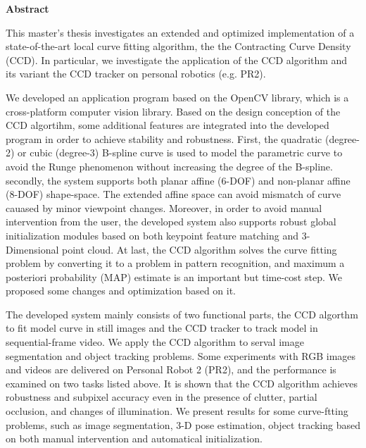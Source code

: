 

\clearemptydoublepage
{}
{}        





\vspace*{2cm}
\begin{center}
{\Large \bf Abstract}
\end{center}
\vspace{1cm}

This master's thesis investigates an extended and optimized
implementation of a state-of-the-art local curve fitting algorithm,
the the Contracting Curve Density (CCD).
In particular, we investigate
the application of the CCD algorithm and its variant the CCD tracker
on personal robotics (e.g. PR2).

We developed an application program based on the OpenCV library, which
is a cross-platform computer vision library. Based on the
design conception of the CCD algortihm, some
additional features are integrated into the developed program in order to
achieve stability and robustness. First, the quadratic (degree-2) or
cubic (degree-3) B-spline curve is used to model the parametric curve
to avoid the Runge phenomenon without increasing the degree of the
B-spline. secondly, the system supports both planar affine (6-DOF) and
non-planar affine (8-DOF) shape-space. The extended affine space can avoid
mismatch of curve cauased by minor viewpoint changes. Moreover, in
order to avoid manual intervention from the user, the developed system
also supports robust global initialization modules based on both keypoint
feature matching and 3-Dimensional point cloud. At last, the CCD
algorithm solves the curve fitting problem by converting it to a
problem in pattern recognition, and maximum a posteriori probability
(MAP) estimate is an important but time-cost step. We proposed some
changes and optimization based on it.

The developed system mainly consists of two functional parts, the CCD
algorthm to fit model curve in still images and the CCD tracker to
track model in sequential-frame video. We apply the CCD algorithm to
serval image segmentation and object tracking problems. Some experiments with RGB
images and videos are delivered on Personal Robot 2 (PR2), and the
performance is examined on two tasks listed above.  It is shown that
the CCD algorithm achieves robustness and subpixel accuracy even in the
presence of clutter, partial occlusion, and changes of
illumination. We present results for some curve-ftting problems, such
as image segmentation, 3-D pose estimation, object tracking based on
both manual intervention and automatical initialization.
















